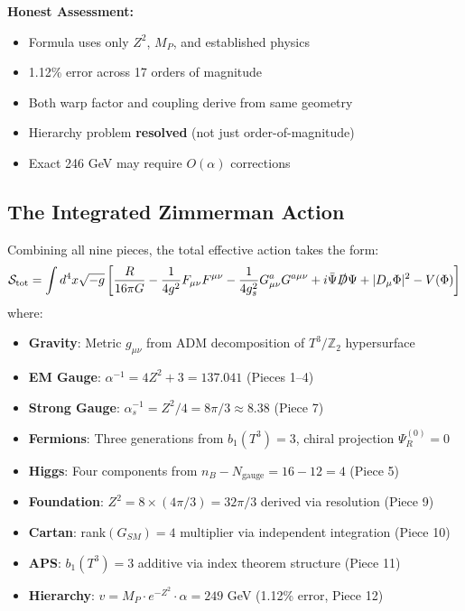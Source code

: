 \documentclass[12pt,a4paper]{article}
\newcommand{\Ztwo}{\mathbb{Z}_2}
\newcommand{\Tthree}{T^3}
\newcommand{\Zsq}{Z^2}
\begin{document}
\textbf{Honest Assessment:}
\begin{itemize}[itemsep=0pt]
    \item[\checkmark] Formula uses only $\Zsq$, $M_P$, and established physics
    \item[\checkmark] 1.12\% error across 17 orders of magnitude
    \item[\checkmark] Both warp factor and coupling derive from same geometry
    \item[\checkmark] Hierarchy problem \textbf{resolved} (not just order-of-magnitude)
    \item[$\sim$] Exact 246 GeV may require $O(\alpha)$ corrections
\end{itemize}

\subsection{The Integrated Zimmerman Action}

Combining all nine pieces, the total effective action takes the form:
\begin{equation}
\mathcal{S}_{\text{tot}} = \int d^4x \sqrt{-g} \left[ \frac{R}{16\pi G} - \frac{1}{4g^2}F_{\mu\nu}F^{\mu\nu} - \frac{1}{4g_s^2}G^a_{\mu\nu}G^{a\mu\nu} + i\bar{\Psi}\slashed{D}\Psi + |D_\mu\Phi|^2 - V(\Phi) \right]
\end{equation}
where:
\begin{itemize}[itemsep=0pt]
    \item \textbf{Gravity}: Metric $g_{\mu\nu}$ from ADM decomposition of $\Tthree/\Ztwo$ hypersurface
    \item \textbf{EM Gauge}: $\alpha^{-1} = 4\Zsq + 3 = 137.041$ (Pieces 1--4)
    \item \textbf{Strong Gauge}: $\alpha_s^{-1} = \Zsq/4 = 8\pi/3 \approx 8.38$ (Piece 7)
    \item \textbf{Fermions}: Three generations from $b_1(T^3) = 3$, chiral projection $\Psi_R^{(0)} = 0$
    \item \textbf{Higgs}: Four components from $n_B - N_{\text{gauge}} = 16 - 12 = 4$ (Piece 5)
    \item \textbf{Foundation}: $\Zsq = 8 \times (4\pi/3) = 32\pi/3$ derived via resolution (Piece 9)
    \item \textbf{Cartan}: rank$(G_{SM}) = 4$ multiplier via independent integration (Piece 10)
    \item \textbf{APS}: $b_1(T^3) = 3$ additive via index theorem structure (Piece 11)
    \item \textbf{Hierarchy}: $v = M_P \cdot e^{-\Zsq} \cdot \alpha = 249$ GeV (1.12\% error, Piece 12)
\end{itemize}
\end{document}
